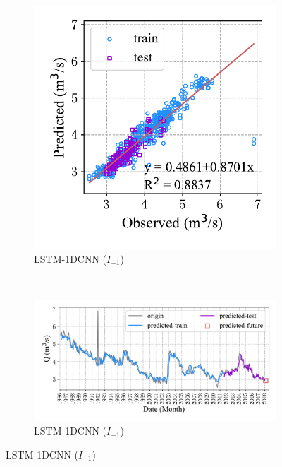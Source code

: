 \begin{figure}[!htbp]
\centering
  \begin{subfigure}[b]{0.305\textwidth}
    \includegraphics[width=\textwidth]{Img/chap4_spr/spr_scatter_in_1_out_2_lstm_cnn.pdf}
    \vspace{-1.2cm}
    \caption{LSTM-1DCNN ($I_{-1}$)}
    \label{fig:spr_scatter_in_1_out_2_lstm_cnn}
  \end{subfigure}
  ~
  \begin{subfigure}[b]{0.615\textwidth}
    \includegraphics[width=\textwidth]{Img/chap4_spr/spr_series_in_1_out_2_lstm_cnn.pdf}
    \vspace{-1.2cm}
    \caption{LSTM-1DCNN ($I_{-1}$)}
    \label{fig:spr_series_in_1_out_2_lstm_cnn}

\end{subfigure}
\end{figure}
